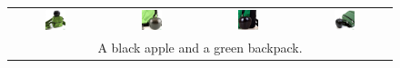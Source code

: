 \begin{figure}[ht!]
    \centering 
    \vspace{-1.8cm}
    \setlength{\tabcolsep}{2.0pt}
    \begin{tabular}{cccc}
        \includegraphics[width=0.24\textwidth]{figures/cross/color_0.jpg} &
        \includegraphics[width=0.24\textwidth]{figures/cross/color_1.jpg} &
        \includegraphics[width=0.24\textwidth]{figures/cross/color_2.jpg} &
        \includegraphics[width=0.24\textwidth]{figures/cross/color_3.jpg} \vspace{-1mm}\\
        \multicolumn{4}{c}{\small A black apple and a green backpack.}\\
        

\end{tabular}
\end{figure}
